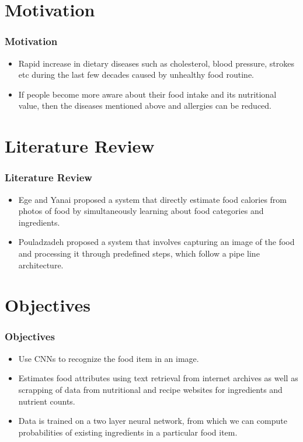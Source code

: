 \documentclass{beamer}
\begin{document}
\section{Motivation}
\begin{frame}
\frametitle{Motivation}
\begin{itemize}
    \item Rapid increase in dietary diseases such as cholesterol, blood pressure, strokes etc during the last few decades caused by unhealthy food routine.
    \item If people become more aware about their food intake and its nutritional value, then the diseases mentioned above and allergies can be reduced.
\end{itemize}
\end{frame}

\section{Literature Review}
\begin{frame}
\frametitle{Literature Review}
\begin{itemize}
    \item Ege and Yanai proposed a system that directly estimate food calories from photos of food by simultaneously learning about food categories and ingredients.\cite{a2}
    \item Pouladzadeh proposed a system that involves capturing an image of the food and processing it through predefined steps, which follow a pipe line architecture.\cite{a3}
\end{itemize}
\end{frame}


\section{Objectives}
\begin{frame}
\frametitle{Objectives}
\begin{itemize}
    \item Use CNNs to recognize the food item in an image.
    \item Estimates food attributes using text retrieval from internet archives as well as scrapping of data from nutritional and recipe websites for ingredients and nutrient counts.
    \item Data is trained on a two layer neural network, from which we can compute probabilities of existing ingredients in a particular food item.
\end{itemize}
\end{frame}
\end{document}
